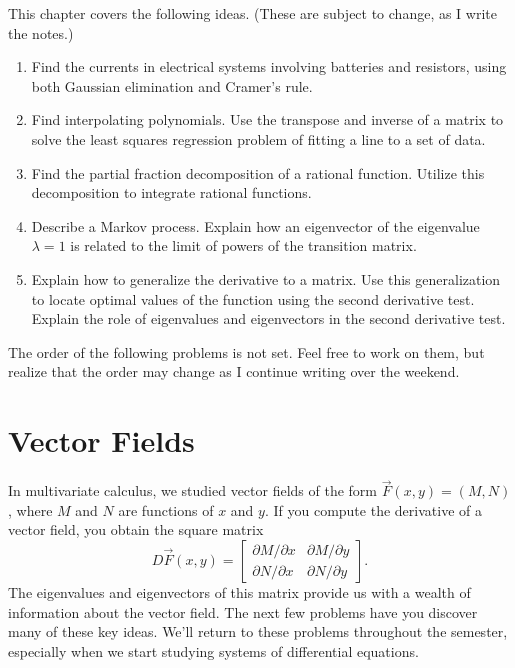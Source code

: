 
\noindent This chapter covers the following ideas. (These are subject to change, as I write the notes.)

\begin{enumerate}

\item Find the currents in electrical systems involving batteries and resistors, using both Gaussian elimination and Cramer's rule.
\item Find interpolating polynomials. Use the transpose and inverse of a matrix to solve the least squares regression problem of fitting a line to a set of data.
\item Find the partial fraction decomposition of a rational function. Utilize this decomposition to integrate rational functions.
\item Describe a Markov process. Explain how an eigenvector of the eigenvalue $\lambda=1$ is related to the limit of powers of the transition matrix.
\item Explain how to generalize the derivative to a matrix. Use this generalization to locate optimal values of the function using the second derivative test. Explain the role  of eigenvalues and eigenvectors in the second derivative test.
\end{enumerate}

{\Huge The order of the following problems is not set.  Feel free to work on them, but realize that the order may change as I continue writing over the weekend.}

\section{Vector Fields}
In multivariate calculus, we studied vector fields of the form $\vec F(x,y) = (M,N)$, where $M$ and $N$ are functions of $x$ and $y$.  If you compute the derivative of a vector field, you obtain the square matrix
$$D\vec F(x,y) =
\begin{bmatrix}
\partial M/\partial x &
\partial M/\partial y \\
\partial N/\partial x &
\partial N/\partial y 
\end{bmatrix}.
$$ 
The eigenvalues and eigenvectors of this matrix provide us with a wealth of information about the vector field.  The next few problems have you discover many of these key ideas.  We'll return to these problems throughout the semester, especially when we start studying systems of differential equations.

